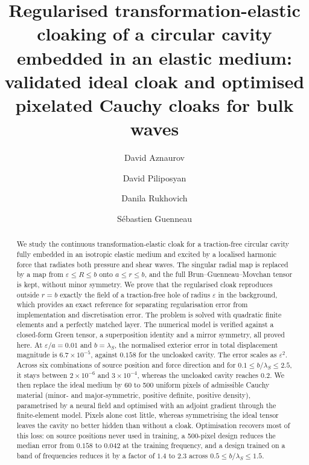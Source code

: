 \documentclass[preprint,12pt]{elsarticle}
\begin{document}
\begin{frontmatter}
\title{Regularised transformation-elastic cloaking of a circular cavity embedded in an
elastic medium: validated ideal cloak and optimised pixelated Cauchy cloaks for bulk waves}

\author[1,2]{David Aznaurov}
\author[1]{David Piliposyan}
\author[1]{Danila Rukhovich}
\author[3]{S\'ebastien Guenneau}


\begin{abstract}
We study the continuous transformation-elastic cloak for a traction-free circular cavity fully
embedded in an isotropic elastic medium and excited by a localised harmonic force that radiates
both pressure and shear waves. The singular radial map is replaced by a map from
$\varepsilon\le R\le b$ onto $a\le r\le b$, and the full Brun--Guenneau--Movchan tensor is kept,
without minor symmetry. We prove that the regularised cloak reproduces outside $r=b$ exactly the
field of a traction-free hole of radius $\varepsilon$ in the background, which provides an exact
reference for separating regularisation error from implementation and discretisation error. The
problem is solved with quadratic finite elements and a perfectly matched layer. The numerical
model is verified against a closed-form Green tensor, a superposition identity and a mirror symmetry,
all proved here. At $\varepsilon/a=0.01$ and $b=\lambda_S$, the normalised exterior error in total
displacement magnitude is $6.7\times10^{-5}$, against $0.158$ for the uncloaked cavity. The error
scales as $\varepsilon^2$. Across six combinations of source position and force direction and for
$0.1\le b/\lambda_S\le 2.5$, it stays between $2\times10^{-6}$ and $3\times10^{-4}$, whereas the uncloaked
cavity reaches $0.2$. We then replace the ideal medium by 60 to 500 uniform pixels of admissible Cauchy material
(minor- and major-symmetric, positive definite, positive density), parametrised by a neural field and optimised
with an adjoint gradient through the finite-element model. Pixels alone cost little, whereas symmetrising the ideal
tensor leaves the cavity no better hidden than without a cloak. Optimisation recovers most of this loss: on source
positions never used in training, a 500-pixel design reduces the median error from $0.158$ to $0.042$ at the training
frequency, and a design trained on a band of frequencies reduces it by a factor of $1.4$ to $2.3$ across
$0.5\le b/\lambda_S\le1.5$.
\end{abstract}


\end{frontmatter}
\end{document}
